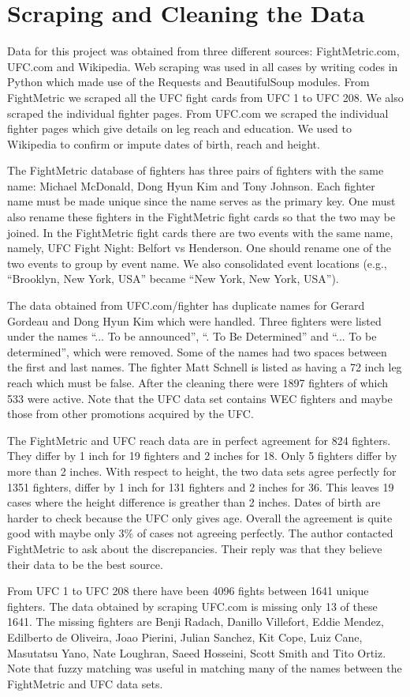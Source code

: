 \section{Scraping and Cleaning the Data}
\label{cleaning_data}
Data for this project was obtained from three different sources:
FightMetric.com, UFC.com and Wikipedia. Web scraping was used
in all cases by writing codes in Python which made use
of the Requests and BeautifulSoup modules. From FightMetric we scraped all the UFC fight
cards from UFC 1 to UFC 208. We also scraped the individual fighter
pages. From UFC.com we scraped the individual fighter pages which
give details on leg reach and education. We used to Wikipedia
to confirm or impute dates of birth, reach and height.

The FightMetric database of fighters has three pairs of fighters
with the same name: Michael McDonald, Dong Hyun Kim and
Tony Johnson. Each fighter name must be made unique since the name
serves as the primary key. One must also rename these fighters
in the FightMetric fight cards so that the two may be joined.
In the FightMetric fight cards there are two events with the same
name, namely, UFC Fight Night: Belfort vs Henderson. One should rename
one of the two events to group by event name. We also consolidated
event locations (e.g., ``Brooklyn, New York, USA'' became ``New York, New York, USA'').

The data obtained from UFC.com/fighter has duplicate names for
Gerard Gordeau and Dong Hyun Kim which were handled. Three fighters were
listed under the names ``... To be announced'', ``. To Be Determined'' and
``... To be determined'', which were removed. Some of the names had
two spaces between the first and last names. The fighter Matt Schnell
is listed as having a 72 inch leg reach which must be false.
After the cleaning there were 1897 fighters of which 533 were active. Note that
the UFC data set contains WEC fighters and maybe those from other promotions
acquired by the UFC.

The FightMetric and UFC reach data are in perfect agreement for 824 fighters.
They differ by 1 inch for 19 fighters and 2 inches for 18. Only 5 fighters
differ by more than 2 inches.
With respect to height, the two data sets agree perfectly for 1351 fighters,
differ by 1 inch for 131 fighters and 2 inches for 36. This leaves 19
cases where the height difference is greather than 2 inches. Dates of birth
are harder to check because the UFC only gives age.
Overall the agreement is quite good with maybe only 3\% of cases not
agreeing perfectly.
The author contacted FightMetric to ask about the discrepancies. Their reply
was that they believe their data to be the best source.

From UFC 1 to UFC 208 there have been 4096 fights between 1641 unique fighters. The
data obtained by scraping UFC.com is missing only 13 of these 1641. The missing
fighters are Benji Radach, Danillo Villefort, Eddie Mendez, Edilberto de Oliveira,
Joao Pierini, Julian Sanchez, Kit Cope, Luiz Cane, Masutatsu Yano, Nate Loughran,
Saeed Hosseini, Scott Smith and Tito Ortiz. Note that fuzzy matching was useful
in matching many of the names between the FightMetric and UFC data sets.

